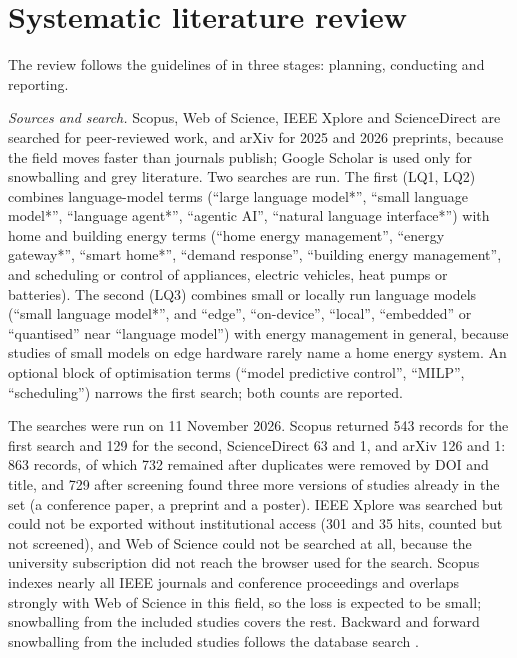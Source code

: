 \section{Systematic literature review}
\label{sec:slr}

The review follows the guidelines of \textcite{kitchenham2007} in three
stages: planning, conducting and reporting.

\textit{Sources and search.} Scopus, Web of Science, IEEE Xplore and
ScienceDirect are searched for peer-reviewed work, and arXiv for 2025
and 2026 preprints, because the field moves faster than journals
publish; Google Scholar is used only for snowballing and grey
literature. Two searches are run. The first (LQ1, LQ2) combines
language-model terms (``large language model*'', ``small language
model*'', ``language agent*'', ``agentic AI'', ``natural language
interface*'') with home and building energy terms (``home energy
management'', ``energy gateway*'', ``smart home*'', ``demand response'',
``building energy management'', and scheduling or control of
appliances, electric vehicles, heat pumps or batteries). The second
(LQ3) combines small or locally run language models (``small language
model*'', and ``edge'', ``on-device'', ``local'', ``embedded'' or
``quantised'' near ``language model'') with energy management in
general, because studies of small models on edge hardware rarely name a
home energy system. An optional block of optimisation terms (``model
predictive control'', ``MILP'', ``scheduling'') narrows the first search;
both counts are reported.

The searches were run on 11 November 2026. Scopus returned 543
records for the first search and 129 for the second, ScienceDirect 63
and 1, and arXiv 126 and 1: 863 records, of which 732 remained after
duplicates were removed by DOI and title, and 729 after screening found
three more versions of studies already in the set (a conference paper,
a preprint and a poster). IEEE Xplore was searched but
could not be exported without institutional access (301 and 35 hits,
counted but not screened), and Web of Science could not be searched at
all, because the university subscription did not reach the browser used
for the search. Scopus indexes nearly all IEEE journals and conference
proceedings and overlaps strongly with Web of Science in this field, so
the loss is expected to be small; snowballing from the included studies
covers the rest. Backward and forward snowballing from the included
studies follows the database search \parencite{wohlin2014}.

